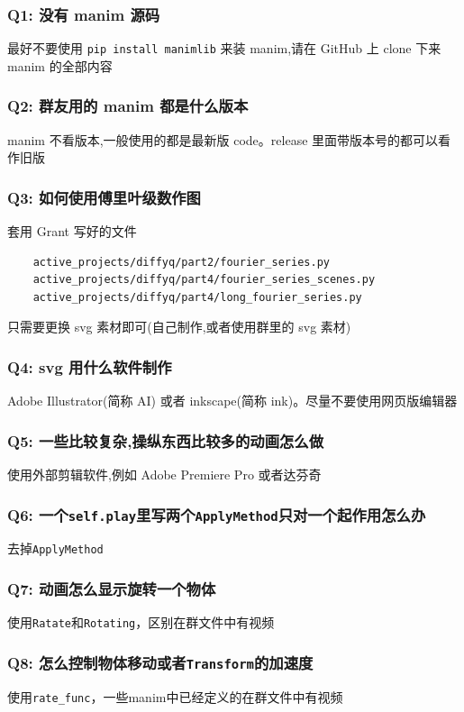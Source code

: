 \documentclass[a4paper]{article}
\begin{document}
\subsubsection*{Q1: 没有 manim 源码}
最好不要使用 \texttt{pip install manimlib} 来装 manim,请在 GitHub 上 clone 下来 manim 的全部内容

\subsubsection*{Q2: 群友用的 manim 都是什么版本}
manim 不看版本,一般使用的都是最新版 code。release 里面带版本号的都可以看作旧版

\subsubsection*{Q3: 如何使用傅里叶级数作图}
套用 Grant 写好的文件
\begin{verbatim}
    active_projects/diffyq/part2/fourier_series.py
    active_projects/diffyq/part4/fourier_series_scenes.py
    active_projects/diffyq/part4/long_fourier_series.py
\end{verbatim}

只需要更换 svg 素材即可(自己制作,或者使用群里的 svg 素材)

\subsubsection*{Q4: svg 用什么软件制作}
Adobe Illustrator(简称 AI) 或者 inkscape(简称 ink)。尽量不要使用网页版编辑器

\subsubsection*{Q5: 一些比较复杂,操纵东西比较多的动画怎么做}
使用外部剪辑软件,例如 Adobe Premiere Pro 或者达芬奇

\subsubsection*{Q6: 一个\texttt{self.play}里写两个\texttt{ApplyMethod}只对一个起作用怎么办}
去掉\texttt{ApplyMethod}

\subsubsection*{Q7: 动画怎么显示旋转一个物体}
使用\texttt{Ratate}和\texttt{Rotating}，区别在群文件中有视频

\subsubsection*{Q8: 怎么控制物体移动或者\texttt{Transform}的加速度}
使用\texttt{rate\_func}，一些manim中已经定义的在群文件中有视频
\end{document}
